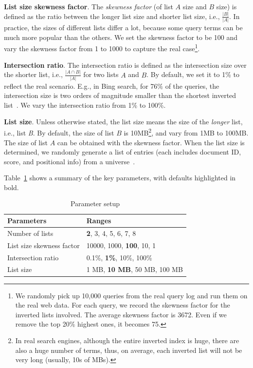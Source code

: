 \textbf{List size skewness factor}. The \emph{skewness factor} (of list $A$ size and $B$ size) is defined as the ratio between the longer list size and shorter list size, i.e., $\frac{|B|}{|A|}$. In practice, the sizes of different lists differ a lot, because some query terms can be much more popular than the others. We set the skewness factor to be 100 and vary the skewness factor from 1 to 1000 to capture the real case\footnote{We randomly pick up 10,000 queries from the real query log and run them on the real web data. For each query, we record the skewness factor for the inverted lists involved. The average skewness factor is 3672. Even if we remove the top 20\% highest ones, it becomes 75.}.



\textbf{Intersection ratio}. The intersection ratio is defined as the intersection size over the shorter list, i.e., $\frac{|A\cap B|}{|A|}$ for two lists $A$ and $B$. By default, we set it to 1\% to reflect the real scenario. E.g., in Bing search, for 76\% of the queries, the intersection size is two orders of magnitude smaller than the shortest inverted list~\cite{Ding2011}. We vary the intersection ratio from 1\% to 100\%.


\textbf{List size}. Unless otherwise stated, the list size means the size of the \emph{longer} list, i.e., list \emph{B}.
By default, the size of list $B$ is 10MB\footnote{In real search engines, although the entire inverted index is huge, there are also a huge number of terms, thus, on average, each inverted list will not be very long (usually, 10s of MBs).}, and vary from 1MB to 100MB. The size of list $A$ can be obtained with the skewness factor. When the list size is determined, we randomly generate a list of entries (each includes document ID, score, and positional info) from a universe~\cite{Ding2011}.


Table~\ref{tab:synData} shows a summary of the key parameters, with defaults highlighted in bold.

\begin{table}[tbp]
\centering
\begin{tabular}{l|l}\hline\hline
\textbf{Parameters}  &   \textbf{Ranges}   \\\hline
Number of lists & \textbf{2}, 3, 4, 5, 6, 7, 8\\\hline
List size skewness factor  & 10000, 1000, \textbf{100}, 10, 1\\\hline
Intersection ratio  &   0.1\%, \textbf{1\%}, 10\%, 100\%\\\hline
List size & 1 MB, \textbf{10 MB}, 50 MB, 100 MB\\\hline\hline
\end{tabular}
\caption{Parameter setup}\label{tab:synData}
\end{table}






